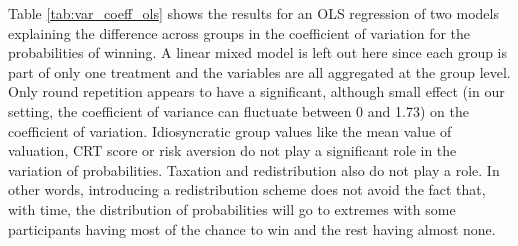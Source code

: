 Table \ref{tab:var_coeff_ols} shows the results for an OLS regression of two models explaining the difference across groups in the coefficient of variation for the probabilities of winning. A linear mixed model is left out here since each group is part of only one treatment and the variables are all aggregated at the group level. Only round repetition appears to have a significant, although small effect (in our setting, the coefficient of variance can fluctuate between 0 and 1.73) on the coefficient of variation. Idiosyncratic group values like the mean value of valuation, CRT score or risk aversion do not play a significant role in the variation of probabilities. Taxation and redistribution also do not play a role. In other words, introducing a redistribution scheme does not avoid the fact that, with time, the distribution of probabilities will go to extremes with some participants having most of the chance to win and the rest having almost none.\\


